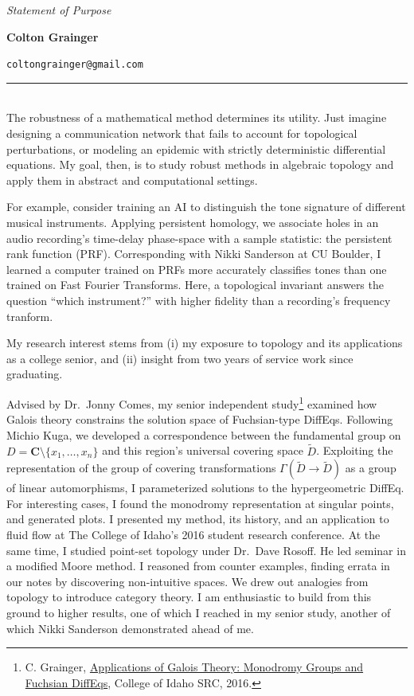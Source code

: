 \documentclass{article}
\makeatletter
\newcommand\textbox[1]{\parbox{.33\textwidth}{#1}}
\newcommand\printheader{
  \noindent 
  \textbox{\emph{Statement of Purpose}} 
  \textbox{\centerline{\large\bf Colton Grainger}} 
  \textbox{\raggedleft \texttt{coltongrainger@gmail.com}\ 
}

\vspace{-14pt} 
\noindent 
\rule{\textwidth}{1pt}\\ }
\makeatother
\begin{document}
 

\printheader

The robustness of a mathematical method determines its utility. Just imagine designing a communication network that fails to account for topological perturbations, or modeling an epidemic with strictly deterministic differential equations. My goal, then, is to study robust methods in algebraic topology and apply them in abstract and computational settings.

For example, consider training an AI to distinguish the tone signature of different musical instruments. Applying persistent homology, we associate holes in an audio recording's time-delay phase-space with a sample statistic: the persistent rank function (PRF). Corresponding with Nikki Sanderson at CU Boulder, I learned a computer trained on PRFs more accurately classifies tones than one trained on Fast Fourier Transforms. Here, a topological invariant answers the question ``which instrument?'' with higher fidelity than a recording's frequency tranform.

My research interest stems from (i) my exposure to topology and its applications as a college senior, and (ii) insight from two years of service work since graduating.

Advised by Dr.~Jonny Comes, my senior independent study\footnote{C. Grainger, \href{http://coltongrainger.com/documents/cgrainger_coursework_galois_poster.pdf}{Applications of Galois Theory: Monodromy Groups and Fuchsian DiffEqs}, College of Idaho SRC, 2016.} examined how Galois theory constrains the solution space of Fuchsian-type DiffEqs. Following Michio Kuga, we developed a correspondence between the fundamental group on \(D = \mathbf{C}\setminus\{x_1,\ldots,x_n\}\) and this region's universal covering space \(\tilde{D}\). Exploiting the representation of the group of covering transformations \(\Gamma(\tilde{D} \to \tilde{D})\) as a group of linear automorphisms, I parameterized solutions to the hypergeometric DiffEq. For interesting cases, I found the monodromy representation at singular points, and generated plots. I presented my method, its history, and an application to fluid flow at The College of Idaho's 2016 student research conference. At the same time, I studied point-set topology under Dr.~Dave Rosoff. He led seminar in a modified Moore method. I reasoned from counter examples, finding errata in our notes by discovering non-intuitive spaces. We drew out analogies from topology to introduce category theory. I am enthusiastic to build from this ground to higher results, one of which I reached in my senior study, another of which Nikki Sanderson demonstrated ahead of me.
\end{document}
